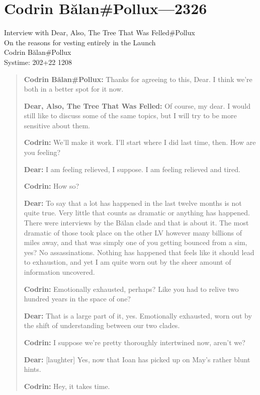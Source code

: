 \hypertarget{codrin-bux103lanpollux-2326}{%
\chapter{Codrin Bălan\#Pollux---2326}\label{codrin-bux103lanpollux-2326}}

Interview with Dear, Also, The Tree That Was Felled\#Pollux\\
On the reasons for vesting entirely in the Launch\\
Codrin Bălan\#Pollux\\
Systime: 202+22 1208

\begin{quote}
\textbf{Codrin Bălan\#Pollux:} Thanks for agreeing to this, Dear. I think we're both in a better spot for it now.

\textbf{Dear, Also, The Tree That Was Felled:} Of course, my dear. I would still like to discuss some of the same topics, but I will try to be more sensitive about them.

\textbf{Codrin:} We'll make it work. I'll start where I did last time, then. How are you feeling?

\textbf{Dear:} I am feeling relieved, I suppose. I am feeling relieved and tired.

\textbf{Codrin:} How so?

\textbf{Dear:} To say that a lot has happened in the last twelve months is not quite true. Very little that counts as dramatic or anything has happened. There were interviews by the Bălan clade and that is about it. The most dramatic of those took place on the other LV however many billions of miles away, and that was simply one of you getting bounced from a sim, yes? No assassinations. Nothing has happened that feels like it should lead to exhaustion, and yet I am quite worn out by the sheer amount of information uncovered.

\textbf{Codrin:} Emotionally exhausted, perhaps? Like you had to relive two hundred years in the space of one?

\textbf{Dear:} That is a large part of it, yes. Emotionally exhausted, worn out by the shift of understanding between our two clades.

\textbf{Codrin:} I suppose we're pretty thoroughly intertwined now, aren't we?

\textbf{Dear:} {[}laughter{]} Yes, now that Ioan has picked up on May's rather blunt hints.

\textbf{Codrin:} Hey, it takes time.


\end{quote}
